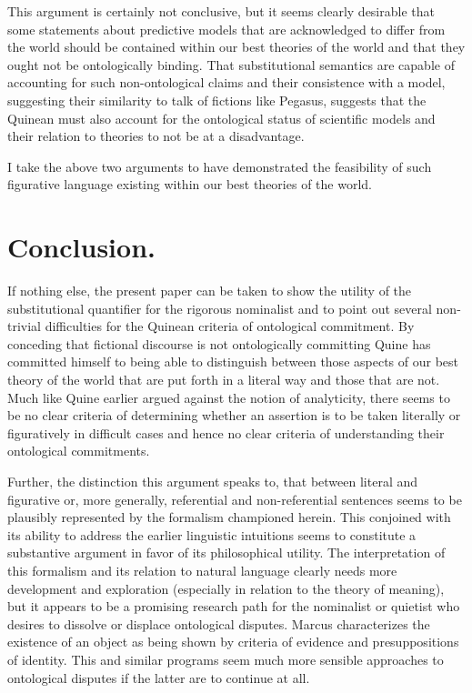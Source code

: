 \documentclass[12pt,letterpaper]{article}
\begin{document}
\begin{doublespace}
This argument is certainly not conclusive, but it seems clearly
desirable that some statements about predictive models that are
acknowledged to differ from the world should be contained within our
best theories of the world and that they ought not be ontologically
binding.  That substitutional semantics are capable of accounting for
such non-ontological claims and their consistence with a model,
suggesting their similarity to talk of fictions like Pegasus, suggests
that the Quinean must also account for the ontological status of
scientific models and their relation to theories to not be at a
disadvantage.

I take the above two arguments to have demonstrated the feasibility of
such figurative language existing within our best theories of the
world.


\section{Conclusion.}

If nothing else, the present paper can be taken to show the utility of
the substitutional quantifier for the rigorous nominalist and to point
out several non-trivial difficulties for the Quinean criteria of
ontological commitment.  By conceding that fictional discourse is not
ontologically committing Quine has committed himself to being able to
distinguish between those aspects of our best theory of the world that
are put forth in a literal way and those that are not.  Much like Quine
earlier argued against the notion of analyticity, there seems to be no
clear criteria of determining whether an assertion is to be taken
literally or figuratively in difficult cases and hence no clear
criteria of understanding their ontological commitments.

Further, the distinction this argument speaks to, that between literal
and figurative or, more generally, referential and non-referential
sentences seems to be plausibly represented by the formalism
championed herein.  This conjoined with its ability to address the
earlier linguistic intuitions seems to constitute a substantive
argument in favor of its philosophical utility. The interpretation of
this formalism and its relation to natural language clearly needs more
development and exploration (especially in relation to the theory of
meaning), but it appears to be a promising research path for the
nominalist or quietist who desires to dissolve or displace ontological
disputes. Marcus \cite{marcus72} characterizes the existence of an
object as being shown by criteria of evidence and presuppositions of
identity.  This and similar programs seem much more sensible
approaches to ontological disputes if the latter are to continue at
all.

\end{doublespace}

\newpage

{}
\end{document}
